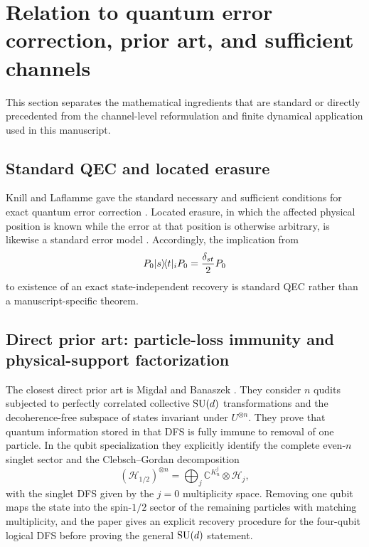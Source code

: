 \section{Relation to quantum error correction, prior art, and sufficient channels}
\label{sec:qec}

This section separates the mathematical ingredients that are standard or directly precedented from the channel-level reformulation and finite dynamical application used in this manuscript.

\subsection{Standard QEC and located erasure}

Knill and Laflamme gave the standard necessary and sufficient conditions for exact quantum error correction \cite{KnillLaflamme1997}.  Located erasure, in which the affected physical position is known while the error at that position is otherwise arbitrary, is likewise a standard error model \cite{GrasslBethPellizzari1997}.  Accordingly, the implication from
\begin{equation}
  P_0\lvert s\rangle\!\langle t\rvert_iP_0=\frac{\delta_{st}}2P_0
\end{equation}
to existence of an exact state-independent recovery is standard QEC rather than a manuscript-specific theorem.

\subsection{Direct prior art: particle-loss immunity and physical-support factorization}

The closest direct prior art is Migda\l{} and Banaszek \cite{MigdalBanaszek2011}.  They consider $n$ qudits subjected to perfectly correlated collective $\mathrm{SU}(d)$ transformations and the decoherence-free subspace of states invariant under $U^{\otimes n}$.  They prove that quantum information stored in that DFS is fully immune to removal of one particle.  In the qubit specialization they explicitly identify the complete even-$n$ singlet sector and the Clebsch--Gordan decomposition
\begin{equation}
  (\mathcal H_{1/2})^{\otimes n}
  =\bigoplus_j \mathbb C^{K_n^j}\otimes\mathcal H_j,
\end{equation}
with the singlet DFS given by the $j=0$ multiplicity space.  Removing one qubit maps the state into the spin-$1/2$ sector of the remaining particles with matching multiplicity, and the paper gives an explicit recovery procedure for the four-qubit logical DFS before proving the general $\mathrm{SU}(d)$ statement.

